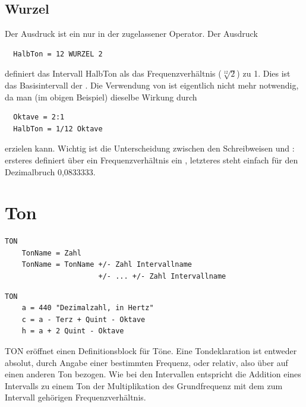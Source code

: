 {
\subsection{ Wurzel}
\label{sec:SX_ROOT}



Der Ausdruck  ist ein nur in der
 zugelassener
Operator. Der Ausdruck

\begin{verbatim}
  HalbTon = 12 WURZEL 2 
\end{verbatim}


definiert das Intervall HalbTon als das Frequenzverhältnis 
($\sqrt[12]{2}$) zu 1. Dies ist das Basisintervall der . Die Verwendung von  ist eigentlich nicht 
mehr notwendig, da man (im obigen Beispiel) dieselbe Wirkung 
durch

\begin{verbatim}
  Oktave = 2:1 
  HalbTon = 1/12 Oktave 
\end{verbatim}


erzielen kann. Wichtig ist die Unterscheidung zwischen den Schreibweisen 
 und : ersteres definiert über ein Frequenzverhältnis 
ein , letzteres steht einfach für 
den Dezimalbruch 0,0833333.

\section{Ton}
\label{sec:SX_TONE}


\begin{verbatim}
TON
    TonName = Zahl
    TonName = TonName +/- Zahl Intervallname 
                      +/- ... +/- Zahl Intervallname
\end{verbatim}




\begin{verbatim}
TON
    a = 440 "Dezimalzahl, in Hertz"
    c = a - Terz + Quint - Oktave 
    h = a + 2 Quint - Oktave
\end{verbatim}




TON eröffnet einen Definitionsblock für Töne. Eine Tondeklaration 
ist entweder absolut, durch Angabe einer bestimmten Frequenz, 
oder relativ, also über  auf einen 
anderen Ton bezogen. Wie bei den Intervallen entspricht die Addition 
eines Intervalls zu einem Ton der Multiplikation des Grundfrequenz 
mit dem zum Intervall gehörigen Frequenzverhältnis.


}
